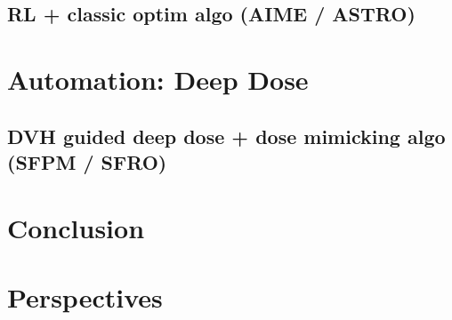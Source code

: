 \documentclass[a4paper]{book}
\begin{document}
	\section{RL + classic optim algo (AIME / ASTRO)}
	
	\chapter{Automation: Deep Dose}
	\begin{chapterabstract}
	\end{chapterabstract}
	\clearpage
	\localtableofcontents
	\section{DVH guided deep dose + dose mimicking algo (SFPM / SFRO)}
	
	\chapter{Conclusion}
	\chapter{Perspectives}
	
\end{document}

